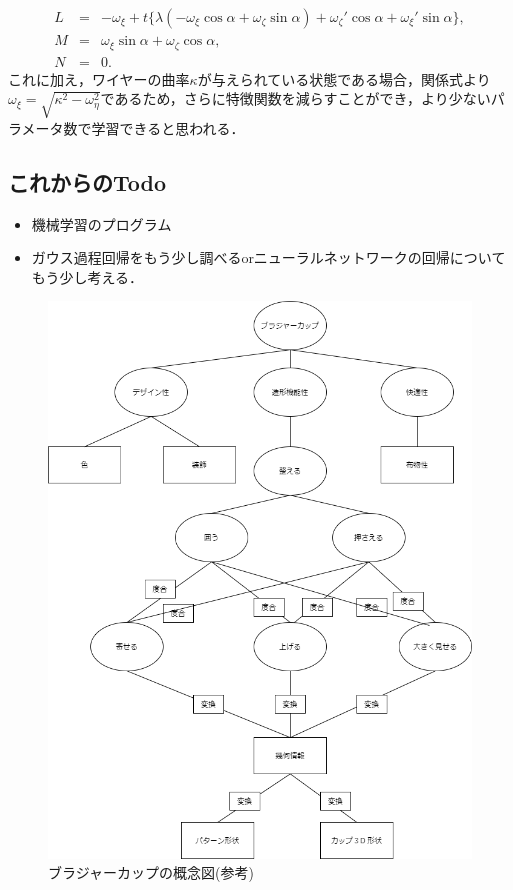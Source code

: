 \documentclass[11pt]{jsarticle}
\begin{document}
			\begin{eqnarray}
			L &=& -\omega_{\xi}+t\{\lambda(-\omega_{\xi}\cos \alpha + \omega_{\zeta}\sin \alpha)+\omega_{\zeta}'\cos \alpha + \omega_{\xi}'\sin \alpha \},  \\
			M &=& \omega_{\xi}\sin \alpha + \omega_{\zeta} \cos \alpha,  \\
			N &=& 0. 
			\end{eqnarray}
			これに加え，ワイヤーの曲率$ \kappa $が与えられている状態である場合，関係式より$ \omega_{\xi} = \sqrt{\kappa^2 - \omega_{\eta}^2} $であるため，さらに特徴関数を減らすことができ，より少ないパラメータ数で学習できると思われる．
		\subsection{これからのTodo}
			\begin{itemize}
				\item 機械学習のプログラム
				\item ガウス過程回帰をもう少し調べるorニューラルネットワークの回帰についてもう少し考える．
			\end{itemize}
		
			\begin{figure}
				\centering
				\includegraphics[scale=0.45]{./figure/BrassiereOntrogy.png}
				\caption{ブラジャーカップの概念図(参考)}
			\end{figure}
	\newpage
\vspace{10cm}

\vspace{14cm}
	\articleSPRfour
	\articleSPRfive
\end{document}
